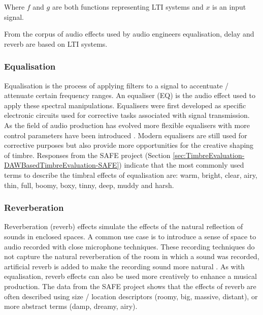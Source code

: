 		Where $f$ and $g$ are both functions representing LTI systems and $x$ is an input signal.

		From the corpus of audio effects used by audio engineers equalisation, delay and reverb are based on LTI
		systems.

		\subsubsection*{Equalisation}
			Equalisation is the process of applying filters to a signal to accentuate / attenuate certain
			frequency ranges. An equaliser (EQ) is the audio effect used to apply these spectral manipulations.
			Equalisers were first developed as specific electronic circuits used for corrective tasks
			associated with signal transmission. As the field of audio production has evolved more flexible
			equalisers with more control parameters have been introduced \citep{gottlieb2007shaping}. Modern
			equalisers are still used for corrective purposes but also provide more opportunities for the
			creative shaping of timbre. Responses from the SAFE project (Section
			\ref{sec:TimbreEvaluation-DAWBasedTimbreEvaluation-SAFE}) indicate that the most commonly used
			terms to describe the timbral effects of equalisation are: warm, bright, clear, airy, thin, full,
			boomy, boxy, tinny, deep, muddy and harsh.

		\subsubsection*{Reverberation}
			Reverberation (reverb) effects simulate the effects of the natural reflection of sounds in enclosed
			spaces. A common use case is to introduce a sense of space to audio recorded with close microphone
			techniques. These recording techniques do not capture the natural reverberation of the room in
			which a sound was recorded, artificial reverb is added to make the recording sound more natural
			\citep{gottlieb2007shaping}. As with equalisation, reverb effects can also be used more creatively
			to enhance a musical production. The data from the SAFE project shows that the effects of
			reverb are often described using size / location descriptors (roomy, big, massive, distant), or
			more abstract terms (damp, dreamy, airy).

